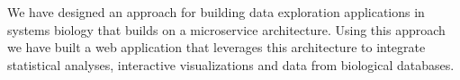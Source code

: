 We have designed an approach for building data exploration applications in
systems biology that builds on a microservice architecture. Using this approach
we have built a web application that leverages this architecture to integrate
statistical analyses, interactive visualizations and data from biological
databases. 

